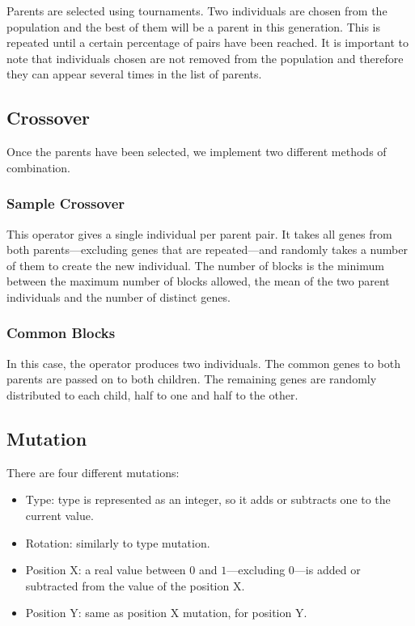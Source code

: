Parents are selected using tournaments. Two individuals are chosen from the population and the best of them will be a parent in this generation. This is repeated until a certain percentage of pairs have been reached. It is important to note that individuals chosen are not removed from the population and therefore they can appear several times in the list of parents. 

\subsection{Crossover}

Once the parents have been selected, we implement two different methods of combination.

\subsubsection{Sample Crossover}\label{ga:cross1}

This operator gives a single individual per parent pair. It takes all genes from both parents---excluding genes that are repeated---and randomly takes a number of them to create the new individual. The number of blocks is the minimum between the maximum number of blocks allowed, the mean of the two parent individuals and the number of distinct genes.

\subsubsection{Common Blocks}\label{ga:cross2}

In this case, the operator produces two individuals. The common genes to both parents are passed on to both children. The remaining genes are randomly distributed to each child, half to one and half to the other. 

\subsection{Mutation}\label{ga:mut}

There are four different mutations:

\begin{itemize}
	\item Type: type is represented as an integer, so it adds or subtracts one to the current value.
	\item Rotation: similarly to type mutation.
	\item Position X: a real value between $0$ and $1$---excluding $0$---is added or subtracted from the value of the position X.
	\item Position Y: same as position X mutation, for position Y.
\end{itemize}

